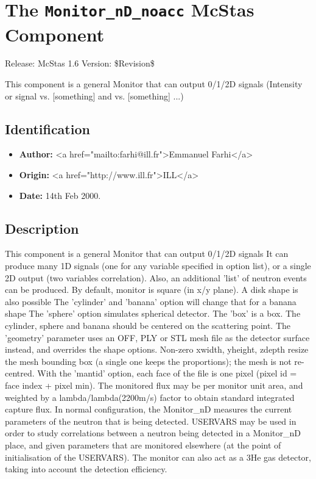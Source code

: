 \section{The \texttt{Monitor\_nD\_noacc} McStas Component}
Release: McStas 1.6
Version: \$Revision\$

This component is a general Monitor that can output 0/1/2D signals
(Intensity or signal vs. [something] and vs. [something] ...)

\subsection*{Identification}
\begin{itemize}
  \item \textbf{Author:} \textless{}a href="mailto:farhi@ill.fr"\textgreater{}Emmanuel Farhi\textless{}/a\textgreater{}
  \item \textbf{Origin:} \textless{}a href="http://www.ill.fr"\textgreater{}ILL\textless{}/a\textgreater{}
  \item \textbf{Date:} 14th Feb 2000.
\end{itemize}

\subsection*{Description}
This component is a general Monitor that can output 0/1/2D signals It can produce many 1D signals (one for any variable specified in option list), or a single 2D output (two variables correlation). Also, an additional 'list' of neutron events can be produced. By default, monitor is square (in x/y plane). A disk shape is also possible The 'cylinder' and 'banana' option will change that for a banana shape The 'sphere' option simulates spherical detector. The 'box' is a box. The cylinder, sphere and banana should be centered on the scattering point. The 'geometry' parameter uses an OFF, PLY or STL mesh file as the detector surface instead, and overrides the shape options. Non-zero xwidth, yheight, zdepth resize the mesh bounding box (a single one keeps the proportions); the mesh is not re-centred. With the 'mantid' option, each face of the file is one pixel (pixel id = face index + pixel min). The monitored flux may be per monitor unit area, and weighted by a lambda/lambda(2200m/s) factor to obtain standard integrated capture flux. In normal configuration, the Monitor\_nD measures the current parameters of the neutron that is being detected. USERVARS may be used in order to study correlations between a neutron being detected in a Monitor\_nD place, and given parameters that are monitored elsewhere (at the point of initialisation of the USERVARS). The monitor can also act as a 3He gas detector, taking into account the detection efficiency.


